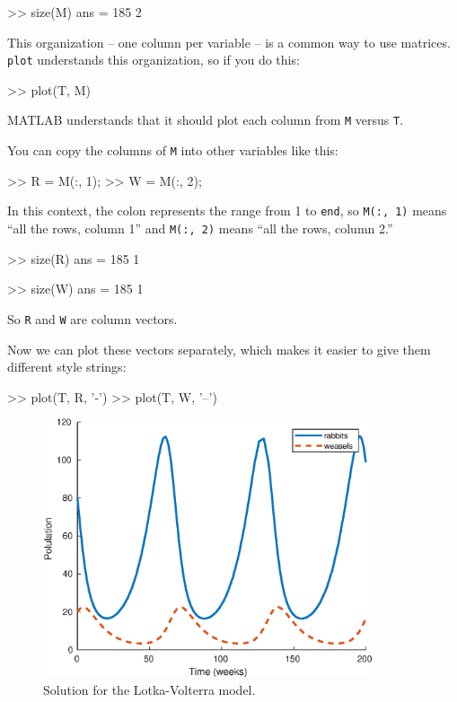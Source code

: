 \documentclass[
]{book}
\numberwithin{Answer}{chapter}
\numberwithin{Exercise}{chapter}
\begin{document}
\begin{code}
>> size(M)
ans = 185     2
\end{code}

This organization -- one column per variable -- is a common way to
use matrices.  {\tt plot} understands this organization, so if you
do this:

\begin{code}
>> plot(T, M)
\end{code}

MATLAB understands that it should plot each column from {\tt M}
versus {\tt T}.


You can copy the columns of {\tt M} into other variables like
this:

\begin{code}
>> R = M(:, 1);
>> W = M(:, 2);
\end{code}

In this context, the colon represents the range from 1 to {\tt end},
so {\tt M(:, 1)} means ``all the rows, column 1'' and
{\tt M(:, 2)} means ``all the rows, column 2.''

\begin{code}
>> size(R)
ans = 185     1

>> size(W)
ans = 185     1
\end{code}

So {\tt R} and {\tt W} are column vectors.


Now we can plot these vectors separately, which makes it easier to give them different style strings:

\begin{code}
>> plot(T, R, '-')
>> plot(T, W, '--')
\end{code}

\begin{figure}
\centerline{\includegraphics[height=3in]{book/figs/lotka.eps}}
\caption{Solution for the Lotka-Volterra model.}
\label{fig:lotka}
\end{figure}
\end{document}
